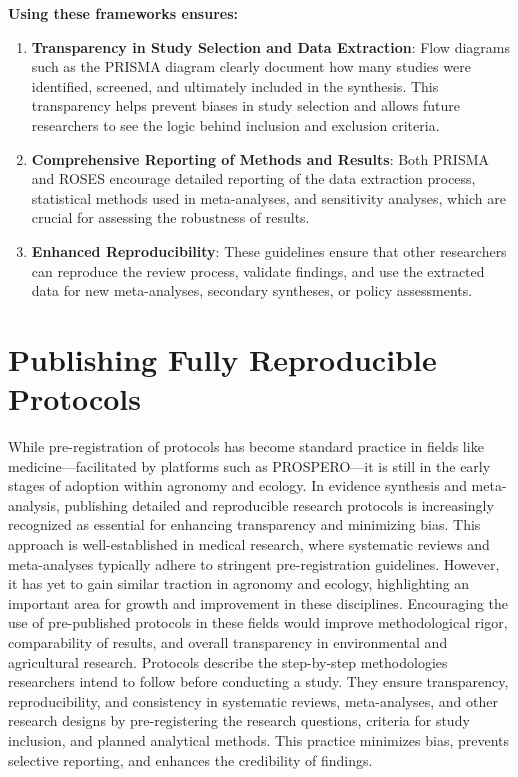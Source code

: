 \documentclass[
]{book}
\begin{document}
\textbf{Using these frameworks ensures:}

\begin{enumerate}
\def\labelenumi{\arabic{enumi}.}
\item
  \textbf{Transparency in Study Selection and Data Extraction}: Flow diagrams such as the PRISMA diagram clearly document how many studies were identified, screened, and ultimately included in the synthesis.
  This transparency helps prevent biases in study selection and allows future researchers to see the logic behind inclusion and exclusion criteria.
\item
  \textbf{Comprehensive Reporting of Methods and Results}: Both PRISMA and ROSES encourage detailed reporting of the data extraction process, statistical methods used in meta-analyses, and sensitivity analyses, which are crucial for assessing the robustness of results.
\item
  \textbf{Enhanced Reproducibility}: These guidelines ensure that other researchers can reproduce the review process, validate findings, and use the extracted data for new meta-analyses, secondary syntheses, or policy assessments.
\end{enumerate}

\section{Publishing Fully Reproducible Protocols}\label{publishing-fully-reproducible-protocols}

While pre-registration of protocols has become standard practice in fields like medicine---facilitated by platforms such as PROSPERO---it is still in the early stages of adoption within agronomy and ecology.
In evidence synthesis and meta-analysis, publishing detailed and reproducible research protocols is increasingly recognized as essential for enhancing transparency and minimizing bias.
This approach is well-established in medical research, where systematic reviews and meta-analyses typically adhere to stringent pre-registration guidelines.
However, it has yet to gain similar traction in agronomy and ecology, highlighting an important area for growth and improvement in these disciplines.
Encouraging the use of pre-published protocols in these fields would improve methodological rigor, comparability of results, and overall transparency in environmental and agricultural research.
Protocols describe the step-by-step methodologies researchers intend to follow before conducting a study.
They ensure transparency, reproducibility, and consistency in systematic reviews, meta-analyses, and other research designs by pre-registering the research questions, criteria for study inclusion, and planned analytical methods.
This practice minimizes bias, prevents selective reporting, and enhances the credibility of findings.
\end{document}

